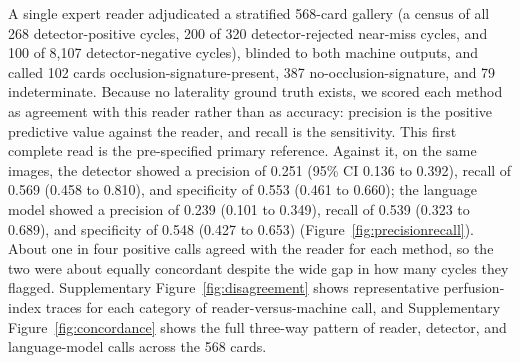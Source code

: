 \documentclass[twocolumn,letterpaper,10pt]{article}
\begin{document}
A single expert reader adjudicated a stratified 568-card gallery (a census of all 268 detector-positive cycles, 200 of 320 detector-rejected near-miss cycles, and 100 of 8{,}107 detector-negative cycles), blinded to both machine outputs, and called 102 cards occlusion-signature-present, 387 no-occlusion-signature, and 79 indeterminate. Because no laterality ground truth exists, we scored each method as agreement with this reader rather than as accuracy: precision is the positive predictive value against the reader, and recall is the sensitivity. This first complete read is the pre-specified primary reference. Against it, on the same images, the detector showed a precision of 0.251 (95\% CI 0.136 to 0.392), recall of 0.569 (0.458 to 0.810), and specificity of 0.553 (0.461 to 0.660); the language model showed a precision of 0.239 (0.101 to 0.349), recall of 0.539 (0.323 to 0.689), and specificity of 0.548 (0.427 to 0.653) (Figure~\ref{fig:precisionrecall}). About one in four positive calls agreed with the reader for each method, so the two were about equally concordant despite the wide gap in how many cycles they flagged. Supplementary Figure~\ref{fig:disagreement} shows representative perfusion-index traces for each category of reader-versus-machine call, and Supplementary Figure~\ref{fig:concordance} shows the full three-way pattern of reader, detector, and language-model calls across the 568 cards.
\end{document}
